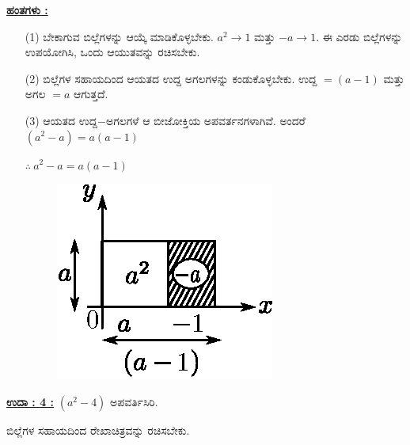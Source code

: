 \noindent
{\textbf{\underline{ಹಂತಗಳು :}}}
\begin{itemize}
\item [(1)] ಬೇಕಾಗುವ ಬಿಲ್ಲೆಗಳನ್ನು ಆಯ್ಕೆ ಮಾಡಿಕೊಳ್ಳಬೇಕು. $a^2 \rightarrow 1$ ಮತ್ತು $-a \rightarrow 1$. ಈ ಎರಡು ಬಿಲ್ಲೆಗಳನ್ನು ಉಪಯೋಗಿಸಿ, ಒಂದು ಆಯುತವನ್ನು ರಚಿಸಬೇಕು. 
\item [(2)] ಬಿಲ್ಲೆಗಳ ಸಹಾಯದಿಂದ ಆಯತದ ಉದ್ದ ಅಗಲಗಳನ್ನು ಕಂಡುಕೊಳ್ಳಬೇಕು. ಉದ್ದ $= (a-1)$ ಮತ್ತು ಅಗಲ $= a$ ಆಗುತ್ತದೆ. 
\item [(3)] ಆಯತದ ಉದ್ದ$-$ಅಗಲಗಳೆ ಆ ಬೀಜೋಕ್ತಿಯ ಅಪವರ್ತನಗಳಾಗಿವೆ. ಅಂದರೆ\break $(a^2 - a) = a(a-1)$

$\therefore~ a^2 - a = a(a-1)$
\begin{figure}[H]
\centering
\includegraphics[scale=0.8]{src/figure/chap3/fig3-36b.eps}
\end{figure}
\end{itemize}

\noindent
{\textbf{\underline{ಉದಾ : 4 :}}} $(a^2 - 4)$ ಅಪವರ್ತಿಸಿರಿ. 

ಬಿಲ್ಲೆಗಳ ಸಹಾಯದಿಂದ ರೇಖಾಚಿತ್ರವನ್ನು ರಚಿಸಬೇಕು.

\eject

